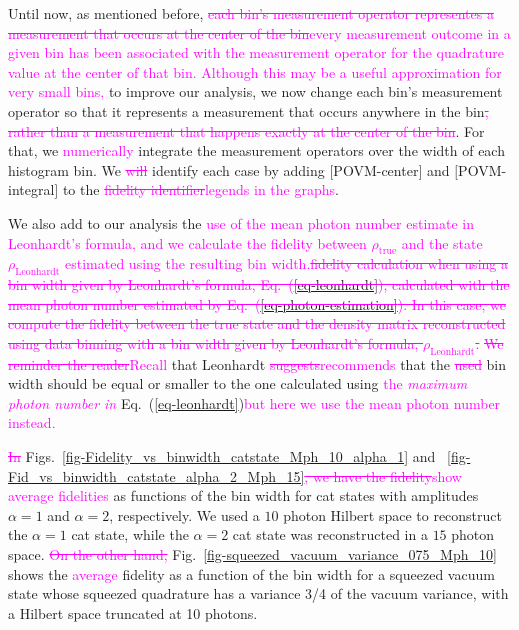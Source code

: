 \documentclass[
reprint,
superscriptaddress,
showpacs,
amsmath,
amssymb,
aps,
pra,
longbibliography
]{revtex4-1}
\providecommand{\aucmnt}[1]{#1}
\providecommand{\editcolor}[2]{\textcolor{#1}{#2}}
\providecommand{\aucmnt}[1]{}
\providecommand{\editcolor}[2]{#2}
\newcommand{\SG}[1]{\editcolor{magenta}{#1}}
\newcommand{\SGs}[1]{\aucmnt{\editcolor{magenta}{\sout{#1}}}}
\newcommand{\rhotrue}{\rho_{\text{true}}}
\begin{document}
Until now, as mentioned before, \SGs{each bin's measurement operator
  representes a measurement that occurs at the center of the
  bin}\SG{every measurement outcome in a given bin has been associated
  with the measurement operator for the quadrature value at the center
  of that bin.  Although this may be a useful approximation for very
  small bins,} to improve our analysis, we now change each bin's
measurement operator so that it represents a measurement that occurs
anywhere in the bin\SGs{, rather than a measurement that happens
  exactly at the center of the bin}. For that, we \SG{numerically}
integrate the measurement operators over the width of each histogram
bin. We \SGs{will} identify each case by adding $[$POVM-center$]$ and
$[$POVM-integral$]$ to the \SGs{fidelity identifier}\SG{legends in the
  graphs}.

We also add to our analysis the \SG{use of the mean photon number
  estimate in Leonhardt's formula, and we calculate the fidelity
  between $\rhotrue$ and the state $\rho_{\mathrm{Leonhardt}}$
  estimated using the resulting bin width.}\SGs{fidelity calculation
  when using a bin width given by Leonhardt's formula,
  Eq.~(\ref{eq-leonhardt}), calculated with the mean photon number
  estimated by Eq.~(\ref{eq-photon-estimation}). In this case, we
  compute the fidelity between the true state and the density matrix
  reconstructed using data binning with a bin width given by
  Leonhardt's formula, $\rho_{\mathrm{Leonhardt}}$.} \SGs{We reminder
  the reader}\SG{Recall} that Leonhardt \SGs{suggests}\SG{recommends}
that the \SGs{used} bin width should be equal or smaller to the one
calculated using \SG{the \em{maximum} photon number in}
Eq.~(\ref{eq-leonhardt})\SG{but here we use the mean photon number
  instead.}

\SGs{In} Figs.~\ref{fig-Fidelity_vs_binwidth_catstate_Mph_10_alpha_1}
and ~\ref{fig-Fid_vs_binwidth_catstate_alpha_2_Mph_15}\SGs{, we have
  the fidelity}\SG{show average fidelities} as functions of the bin
width for cat states with amplitudes $\alpha=1$ and $\alpha=2$,
respectively. We used a $10$ photon Hilbert space to reconstruct the
$\alpha = 1$ cat state, while the $\alpha = 2$ cat state was
reconstructed in a $15$ photon space. \SGs{On the other hand,}
Fig.~\ref{fig-squeezed_vacuum_variance_075_Mph_10} shows the
\SG{average} fidelity as a function of the bin width for a squeezed
vacuum state whose squeezed quadrature has a variance 3/4 of the
vacuum variance, with a Hilbert space truncated at 10 photons.
\end{document}
